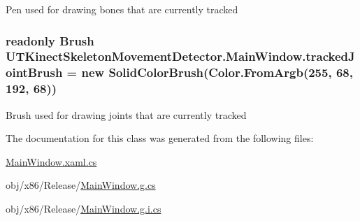 Pen used for drawing bones that are currently tracked 

\hypertarget{classUTKinectSkeletonMovementDetector_1_1MainWindow_a32df891deb0a6cbcb5ce39a10b360640}{
\subsubsection[{tracked\-Joint\-Brush}]{\setlength{\rightskip}{0pt plus 5cm}readonly Brush U\-T\-Kinect\-Skeleton\-Movement\-Detector.\-Main\-Window.\-tracked\-Joint\-Brush = new Solid\-Color\-Brush(Color.\-From\-Argb(255, 68, 192, 68))\hspace{0.3cm}{\ttfamily [private]}}}\label{classUTKinectSkeletonMovementDetector_1_1MainWindow_a32df891deb0a6cbcb5ce39a10b360640}


Brush used for drawing joints that are currently tracked 



The documentation for this class was generated from the following files\-:\begin{DoxyCompactItemize}
\item 
\hyperlink{MainWindow_8xaml_8cs}{Main\-Window.\-xaml.\-cs}\item 
obj/x86/\-Release/\hyperlink{Release_2MainWindow_8g_8cs}{Main\-Window.\-g.\-cs}\item 
obj/x86/\-Release/\hyperlink{Release_2MainWindow_8g_8i_8cs}{Main\-Window.\-g.\-i.\-cs}\end{DoxyCompactItemize}
